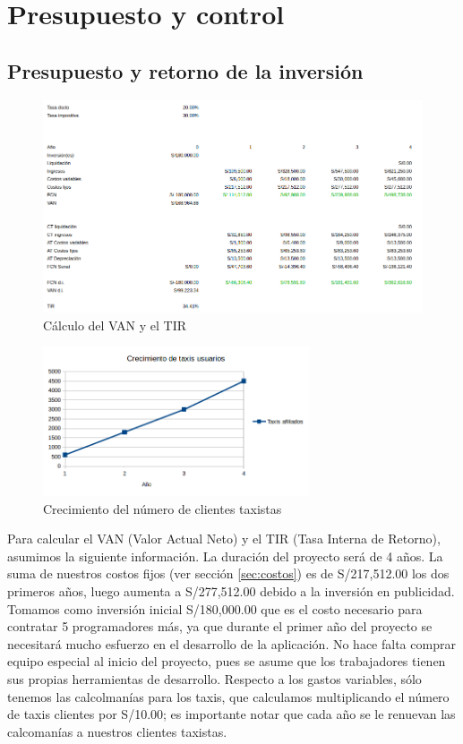 \chapter{Presupuesto y control}

\section{Presupuesto y retorno de la inversión}

\begin{figure}[htb]
\centering
\includegraphics[width=1\textwidth]{./img/van_tir}
\caption{Cálculo del VAN y el TIR} \label{fig:van_tir}
\end{figure}

\begin{figure}[htb]
\centering
\includegraphics[width=0.7\textwidth]{./img/taxis}
\caption{Crecimiento del número de clientes taxistas} \label{fig:taxis}
\end{figure}

Para calcular el VAN (Valor Actual Neto) y el TIR (Tasa Interna de Retorno), asumimos la siguiente información. La duración del proyecto será de 4 años. La suma de nuestros costos fijos (ver sección \ref{sec:costos}) es de S/217,512.00 los dos primeros años, luego aumenta a S/277,512.00 debido a la inversión en publicidad. Tomamos como inversión inicial S/180,000.00 que es el costo necesario para contratar 5 programadores más, ya que durante el primer año del proyecto se necesitará mucho esfuerzo en el desarrollo de la aplicación. No hace falta comprar equipo especial al inicio del proyecto, pues se asume que los trabajadores tienen sus propias herramientas de desarrollo. Respecto a los gastos variables, sólo tenemos las calcolmanías para los taxis, que calculamos multiplicando el número de taxis clientes por S/10.00; es importante notar que cada año se le renuevan las calcomanías a nuestros clientes taxistas.

